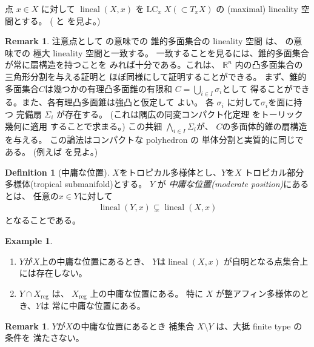 \documentclass[a4paper,dvipdfmx,reqno,12pt]{amsart}
\theoremstyle{definition}
\newtheorem{definition}[theorem]{Definition}
\newtheorem{example}[theorem]{Example}
\newtheorem{remark}[theorem]{Remark}
\newcommand{\opn}[1]{\operatorname{#1}}
\numberwithin{equation}{section}
\begin{document}
点 $x\in X$ に対して
$\opn{lineal}(X,x)$ を$\opn{LC}_x X (\subset T_x X)$
の (maximal) lineality 空間とする。
(\cite[]{MR4246795} と
\cite[]{demedrano2023chern} を見よ。)



\begin{remark}
注意点として
\cite[]{MR3041763}の意味での
錐的多面集合の lineality 空間
は、
\cite[]{MR4246795}の意味での
極大 lineality 空間と一致する。
一致することを見るには、錐的多面集合が常に扇構造を持つことを
みれば十分である。これは、
$\mathbb{R}^{n}$ 内の凸多面集合の三角形分割を与える証明と
ほぼ同様にして証明することができる。
まず、錐的多面集合$C$は幾つかの有理凸多面錐の有限和
$C=\bigcup_{i\in I}\sigma_i$として
得ることができる。また、各有理凸多面錐は強凸と仮定して
よい。
各 $\sigma_i$ に対して$\sigma_i$を面に持つ
完備扇 $\Sigma_i$ が存在する。
(これは隅広の同変コンパクト化定理
\cite[Theorem 3]{MR337963}をトーリック幾何に適用
することで求まる。)
この共細 $\bigwedge_{i\in I}\Sigma_i$が、
$C$の多面体的錐の扇構造を与える。
この論法はコンパクトな polyhedron の
単体分割と実質的に同じである。
(例えば\cite[Theorem 2.11]{MR665919}
を見よ。)
\end{remark}

\begin{definition}[{中庸な位置}]
\label{definition-permissible-position}
$X$をトロピカル多様体とし、$Y$を$X$
トロピカル部分多様体(tropical submanifold)とする。
$Y$ が \emph{中庸な位置(moderate position)}にあるとは、
任意の$x\in Y$に対して
\begin{align}
     \opn{lineal}(Y,x) \subsetneq
 \opn{lineal}(X,x)
\end{align}
となることである。
\end{definition}

\begin{example}
\begin{enumerate}
\item $Y$が$X$上の中庸な位置にあるとき、
$Y$は$\opn{lineal}(X,x)$
が自明となる点集合上には存在しない。
\item $Y\cap X_{\mathrm{reg}}$ は、
$X_{\mathrm{reg}}$ 上の中庸な位置にある。
特に $X$ が整アフィン多様体のとき、$Y$は
常に中庸な位置にある。
\end{enumerate}

\end{example}

\begin{remark}
$Y$が$X$の中庸な位置にあるとき
補集合 $X\setminus Y$ は、大抵 finite type の条件を
満たさない。
\end{remark}
\end{document}
